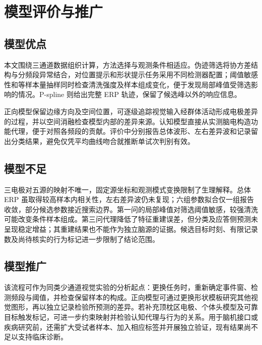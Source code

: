 

\section{模型评价与推广}

\subsection{模型优点}

本文围绕三通道数据组织计算，方法选择与观测条件相适应。伪迹筛选将协方差结构与分频段异常结合，对位置提示和形状提示任务采用不同检测器配置；阈值敏感性和等样本量抽样同时检查清洗强度及样本组成变化，便于发现局部峰值受筛选影响的情况。P-spline 则给出完整 ERP 轨迹，保留了候选峰以外的响应信息。

正向模型保留边缘方向及空间位置，可逐级追踪视觉输入经群体活动形成电极差异的过程，并以空间消融检查模型内部的差异来源。认知模型直接从实测脑电构造功能代理，便于对照各频段的贡献。评价中分别报告总体波形、左右差异波和记录留出分类结果，避免仅凭平均曲线吻合就推断单试次判别有效。

\subsection{模型不足}

三电极对五源的映射不唯一，固定源坐标和观测模式变换限制了生理解释。总体 ERP 虽取得较高样本内相关性，左右差异波仍未复现；六组参数拟合仅一组报告收敛，部分候选参数接近搜索边界。第一问的局部峰值对筛选阈值敏感，较强清洗可能改变条件样本组成。第三问代理降低了特征重建误差，但分类及应答侧预测未呈现稳定增益；其重建结果也不能作为独立脑源的证据。候选目标时刻、有限记录数及尚待核实的行为标记进一步限制了结论范围。

\subsection{模型推广}

该流程可作为同类少通道视觉实验的分析起点：更换任务时，重新确定事件窗、检测频段与阈值，并检查保留样本的构成。正向模型可通过更换形状模板研究其他视觉图形，再以独立记录检验所预测的差异。若补充顶枕区电极、个体头模型及可靠目标触发标记，可进一步约束映射并检验认知代理与行为的关系。用于脑机接口或疾病研究前，还需扩大受试者样本、加入相应标签并开展独立验证，现有结果尚不足以支持临床诊断。
